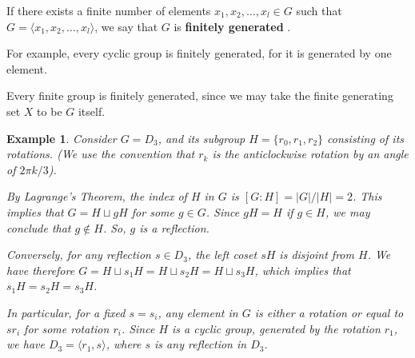 \documentclass[a4paper,12pt]{report}
\newcommand{\abs}[1]{\left|#1\right|}
\newcounter{statement}
\numberwithin{statement}{chapter}
\newtheorem{eg}[statement]{\bf Example}
\numberwithin{equation}{chapter}
\numberwithin{section}{chapter}
\numberwithin{subsection}{section}
\begin{document}
If there exists a finite number of elements $x_1, x_2, \ldots, x_l \in G$
such that $G = \langle x_1, x_2, \ldots, x_l\rangle$,
we say that $G$ is  {\bf finitely generated} .




For example, every cyclic group is finitely generated, for it is generated by one
element.




Every finite group is finitely generated, since we may take the finite generating set
$X$ to be $G$ itself.

\begin{eg}
Consider $G = D_3$, and its subgroup $H = \{r_0, r_1, r_2\}$ consisting of its rotations.
(We use the convention that $r_k$ is the anticlockwise rotation by an angle of $2\pi k/3$).




By Lagrange's Theorem, the index of $H$ in $G$ is $[G: H] = \abs{G}/\abs{H} = 2$.
This implies that $G = H \sqcup gH$ for some $g \in G$.
Since $gH = H$ if $g \in H$, we may conclude that $g \notin H$. So, $g$ is a reflection.




Conversely, for any reflection $s \in D_3$, the left coset $sH$ is disjoint from $H$.
We have therefore $G = H {\sqcup} s_1H = H {\sqcup} s_2H = H {\sqcup} s_3H$,
which implies that $s_1 H = s_2 H = s_3 H$.




In particular, for a fixed $s = s_i$,
any element in $G$ is either a rotation or equal to $s r_i$ for some rotation $r_i$.
Since $H$ is a cyclic group, generated by the rotation $r_1$, we have $D_3 = \langle r_1, s \rangle$,
where $s$ is any reflection in $D_3$.
\end{eg}
\end{document}
